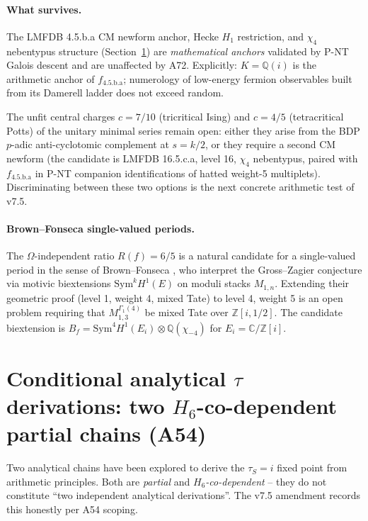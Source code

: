 \documentclass[a4paper,11pt]{article}
\newcommand{\fLM}{f_{\text{4.5.b.a}}}
\newcommand{\Qi}{\mathbb{Q}(i)}
\theoremstyle{definition}
\theoremstyle{remark}
\begin{document}
\paragraph{What survives.}
The LMFDB 4.5.b.a CM newform anchor, Hecke $H_1$ restriction,
and $\chi_4$ nebentypus structure (Section~\ref{sec:tau-derivations})
are \emph{mathematical anchors} validated by P-NT Galois descent
and are unaffected by A72.  Explicitly: $K=\Qi$ is the arithmetic
anchor of $\fLM$; numerology of low-energy fermion observables
built from its Damerell ladder does not exceed random.

The unfit central charges $c=7/10$ (tricritical Ising) and
$c=4/5$ (tetracritical Potts) of the unitary minimal series
remain open: either they arise from the BDP $p$-adic
anti-cyclotomic complement at $s=k/2$, or they require a second
CM newform (the candidate is LMFDB 16.5.c.a, level 16, $\chi_4$
nebentypus, paired with $\fLM$ in P-NT companion identifications
of hatted weight-5 multiplets).  Discriminating between these
two options is the next concrete arithmetic test of v7.5.

\paragraph{Brown--Fonseca single-valued periods.}
The $\Omega$-independent ratio $R(f) = 6/5$ is a natural candidate for a single-valued period in the sense of Brown--Fonseca \cite{BrownFonseca2025}, who interpret the Gross--Zagier conjecture via motivic biextensions $\mathrm{Sym}^k H^1(E)$ on moduli stacks $M_{1,n}$. Extending their geometric proof (level 1, weight 4, mixed Tate) to level 4, weight 5 is an open problem requiring that $M_{1,3}^{\Gamma_1(4)}$ be mixed Tate over $\mathbb{Z}[i, 1/2]$. The candidate biextension is $B_f = \mathrm{Sym}^4 H^1(E_i) \otimes \mathbb{Q}(\chi_{-4})$ for $E_i = \mathbb{C}/\mathbb{Z}[i]$.

\section{Conditional analytical $\tau$ derivations: two
         $H_6$-co-dependent partial chains (A54)}
\label{sec:tau-derivations}

Two analytical chains have been explored to derive the
$\tau_S=i$ fixed point from arithmetic principles.  Both are
\emph{partial} and \emph{$H_6$-co-dependent} -- they do not
constitute ``two independent analytical derivations''.  The
v7.5 amendment records this honestly per A54 scoping.
\end{document}

